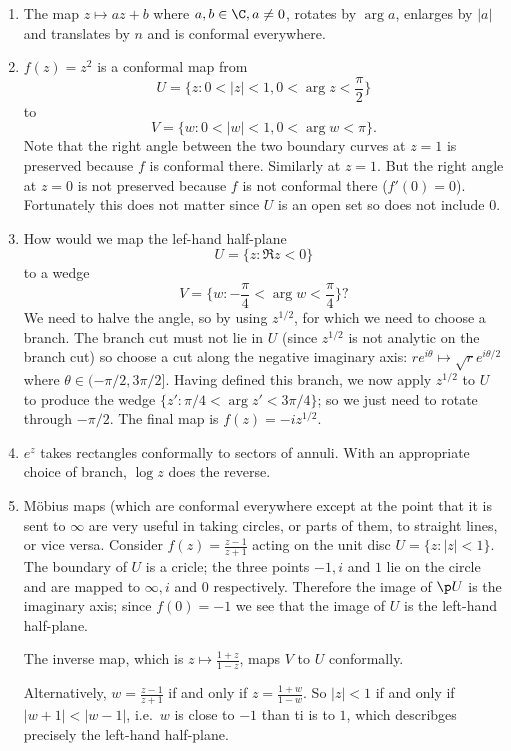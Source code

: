 \documentclass[a4paper]{article}
\begin{document}
\begin{eg}\leavevmode
  \begin{enumerate}
  \item The map \(z \mapsto az + b\) where \(a, b \in \C, a \neq 0\), rotates by \(\arg a\), enlarges by \(|a|\) and translates by \(n\) and is conformal everywhere.
  \item \(f(z) = z^2\) is a conformal map from
    \[
      U = \{z: 0 < |z| < 1, 0 < \arg z < \frac{\pi}{2}\}
    \]
    to
    \[
      V = \{w: 0 < |w| < 1, 0 < \arg w < \pi\}.
    \]
    Note that the right angle between the two boundary curves at \(z = 1\) is preserved because \(f\) is conformal there. Similarly at \(z = 1\). But the right angle at \(z = 0\) is not preserved because \(f\) is not conformal there (\(f'(0) = 0\)). Fortunately this does not matter since \(U\) is an open set so does not include \(0\).
  \item How would we map the lef-hand half-plane
    \[
      U = \{z: \Re z < 0\}
    \]
    to a wedge
    \[
      V = \{w: -\frac{\pi}{4} < \arg w < \frac{\pi}{4}\}?
    \]
    We need to halve the angle, so by using \(z^{1/2}\), for which we need to choose a branch. The branch cut must not lie in \(U\) (since \(z^{1/2}\) is not analytic on the branch cut) so choose a cut along the negative imaginary axis: \(re^{i\theta} \mapsto \sqrt{r} e^{i\theta/2}\) where \(\theta \in (-\pi/2, 3\pi/2]\). Having defined this branch, we now apply \(z^{1/2}\) to \(U\) to produce the wedge \(\{z': \pi/4 < \arg z' < 3\pi/4\}\); so we just need to rotate through \(-\pi/2\). The final map is \(f(z) = -iz^{1/2}\).
  \item \(e^z\) takes rectangles conformally to sectors of annuli. With an appropriate choice of branch, \(\log z\) does the reverse.
  \item Möbius maps (which are conformal everywhere except at the point that it is sent to \(\infty\) are very useful in taking circles, or parts of them, to straight lines, or vice versa. Consider \(f(z) = \frac{z - 1}{z + 1}\) acting on the unit disc \(U = \{z: |z| < 1\}\). The boundary of \(U\) is a cricle; the three points \(-1, i\) and \(1\) lie on the circle and are mapped to \(\infty, i\) and \(0\) respectively. Therefore the image of \(\p U\) is the imaginary axis; since \(f(0) = -1\) we see that the image of \(U\) is the left-hand half-plane.

    The inverse map, which is \(z \mapsto \frac{1 + z}{1 - z}\), maps \(V\) to \(U\) conformally.

    Alternatively, \(w = \frac{z - 1}{z + 1}\) if and only if \(z = \frac{1 + w}{1 - w}\). So \(|z| < 1\) if and only if \(|w + 1| < |w - 1|\), i.e.\ \(w\) is close to \(-1\) than ti is to \(1\), which describges precisely the left-hand half-plane.


\end{enumerate}
\end{eg}
\end{document}
